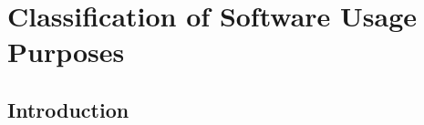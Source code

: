 \chapter{Classification of Software Usage Purposes  }
\label{ch:chapter04}
 
%
%
\section{Introduction}
\label{sec:chapter04:intro}


